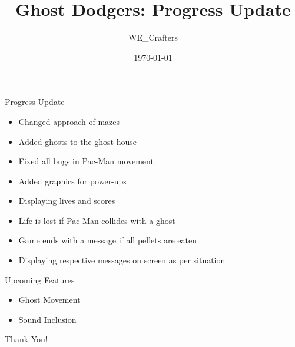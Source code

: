 \documentclass{beamer}
\title{Ghost Dodgers: Progress Update}
\author{WE\_Crafters}
\date{\today}
\begin{document}
\frame{\titlepage}

\begin{frame}{Progress Update}
\begin{itemize}
    \item Changed approach of mazes
    \item Added ghosts to the ghost house
    \item Fixed all bugs in Pac-Man movement
    \item Added graphics for power-ups
    \item Displaying lives and scores
    \item Life is lost if Pac-Man collides with a ghost
    \item Game ends with a message if all pellets are eaten
    \item Displaying respective messages on screen as per situation
\end{itemize}
\end{frame}

\begin{frame}{Upcoming Features}
\begin{itemize}
    \item Ghost Movement
    \item Sound Inclusion
\end{itemize}
\end{frame}

\begin{frame}
    \centering
    \vfill
    \Huge Thank You!
    \vfill
\end{frame}
\end{document}
